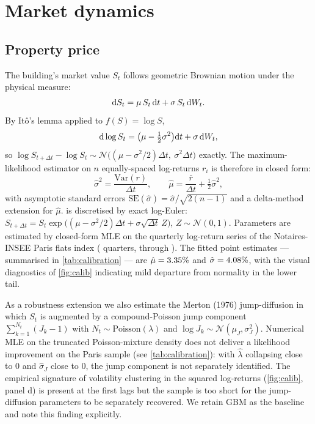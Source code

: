 \section{Market dynamics}\label{sec:dynamics}

\subsection{Property price}

The building's market value $S_t$ follows geometric Brownian motion under
the physical measure:
\begin{equation}
\mathrm{d}S_t = \mu\, S_t\, \mathrm{d}t + \sigma\, S_t\, \mathrm{d}W_t.
\label{eq:gbm}
\end{equation}
By Itô's lemma applied to $f(S) = \log S$,
\begin{equation*}
\mathrm{d}\log S_t = \bigl(\mu - \tfrac{1}{2}\sigma^2\bigr)\mathrm{d}t + \sigma\, \mathrm{d}W_t,
\end{equation*}
so $\log S_{t + \Delta t} - \log S_t \sim \mathcal{N}\bigl((\mu - \sigma^2/2)\Delta t,\ \sigma^2 \Delta t\bigr)$
exactly. The maximum-likelihood estimator on $n$ equally-spaced
log-returns $r_i$ is therefore in closed form:
\begin{equation*}
\hat\sigma^2 = \frac{\mathrm{Var}(r)}{\Delta t},
\qquad
\hat\mu = \frac{\bar r}{\Delta t} + \tfrac{1}{2}\hat\sigma^2,
\end{equation*}
with asymptotic standard errors $\mathrm{SE}(\hat\sigma) =
\hat\sigma / \sqrt{2(n - 1)}$ and a delta-method extension for $\hat\mu$.
 is discretised by exact log-Euler:
$S_{t + \Delta t} = S_t \exp\bigl( (\mu - \sigma^2 / 2)\Delta t + \sigma
\sqrt{\Delta t}\, Z \bigr)$, $Z \sim \mathcal{N}(0, 1)$. Parameters are
estimated by closed-form MLE on the quarterly log-return series of the
Notaires-INSEE Paris flats index (\dataParisN{} quarters, \dataParisStart{}
through \dataParisEnd{}). The fitted point estimates --- summarised in
\cref{tab:calibration} --- are $\hat\mu = 3.35\%{}$ and $\hat\sigma =
4.08\%{}$, with the visual diagnostics of \cref{fig:calib} indicating
mild departure from normality in the lower tail.

As a robustness extension we also estimate the Merton (1976)
jump-diffusion in which $S_t$ is augmented by a compound-Poisson jump
component $\sum_{k=1}^{N_t} (J_k - 1)$ with $N_t \sim \text{Poisson}(\lambda)$
and $\log J_k \sim \mathcal{N}(\mu_J, \sigma_J^2)$. Numerical MLE on the
truncated Poisson-mixture density does not deliver a likelihood improvement
on the Paris sample (see \cref{tab:calibration}): with $\hat\lambda$
collapsing close to $0$ and $\hat\sigma_J$ close to $0$, the jump
component is not separately identified. The empirical signature of
volatility clustering in the squared log-returns (\cref{fig:calib}, panel
d) is present at the first lags but the sample is too short for the
jump-diffusion parameters to be separately recovered. We retain GBM as
the baseline and note this finding explicitly.

